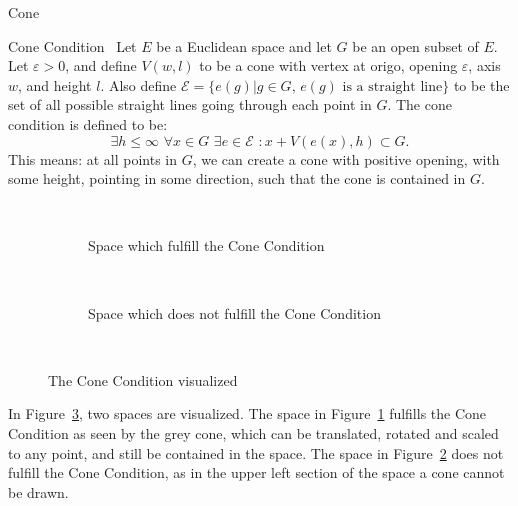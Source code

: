 \begin{defn}{Cone}
    
\end{defn}






\begin{defn}{Cone Condition}~\label{def:cone_condition}
    Let $E$ be a Euclidean space and let $G$ be an open subset of $E$.
    Let $\varepsilon >0$, and define 
    $V(w, l)$ to be a cone with vertex at origo, opening $\varepsilon$, axis $w$,
    and height $l$.
    Also define $\mathcal{E} = \{e(g) | g \in G, \, e(g) \text{ is a straight line}\}$ 
    to be the set of all possible straight lines going through each point in $G$. %
    The cone condition is defined to be: %
    \begin{equation*}
        \exists h \leq \infty \,\,
        \forall x \in G\,\, \exists e\in \mathcal{E} \,\, :
        x + V(e(x), h) \subset G. %
    \end{equation*}
    This means: at all points in $G$, we can create a cone with positive opening,
    with some height, pointing in some direction, such that the cone is contained 
    in $G$.
\end{defn}
\begin{figure}[H]
    \centering
    \begin{subfigure}{.3\textwidth}
        \centering
        
        \caption{Space which fulfill the Cone Condition}~\label{fig:cone_condition_true}
      \end{subfigure}
    \begin{subfigure}{.3\textwidth}
        \centering
        
        \caption{Space which does not fulfill the Cone Condition}~\label{fig:cone_condition_false}
      \end{subfigure}
      \caption{The Cone Condition visualized}~\label{fig:cone_condition_visu}
\end{figure}
In Figure~\ref{fig:cone_condition_visu}, two spaces are visualized.
 The space in Figure~\ref{fig:cone_condition_true} fulfills the Cone Condition as seen 
 by the grey cone, which can be translated, rotated and scaled to any point, and still 
 be contained in the space. The space  
 in Figure~\ref{fig:cone_condition_false} does not fulfill the Cone Condition, as
in the upper left section of the space a cone cannot be drawn.

